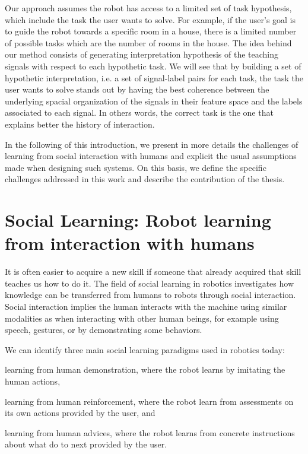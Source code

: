 Our approach assumes the robot has access to a limited set of task hypothesis, which include the task the user wants to solve. For example, if the user's goal is to guide the robot towards a specific room in a house, there is a limited number of possible tasks which are the number of rooms in the house. The idea behind our method consists of generating interpretation hypothesis of the teaching signals with respect to each hypothetic task. We will see that by building a set of hypothetic interpretation, i.e. a set of signal-label pairs for each task, the task the user wants to solve stands out by having the best coherence between the underlying spacial organization of the signals in their feature space and the labels associated to each signal. In others words, the correct task is the one that explains better the history of interaction.

In the following of this introduction, we present in more details the challenges of learning from social interaction with humans and explicit the usual assumptions made when designing such systems. On this basis, we define the specific challenges addressed in this work and describe the contribution of the thesis.

\section{Social Learning: Robot learning from interaction with humans}
\label{sec:intro:social}

It is often easier to acquire a new skill if someone that already acquired that skill teaches us how to do it. The field of social learning in robotics investigates how knowledge can be transferred from humans to robots through social interaction. Social interaction implies the human interacts with the machine using similar modalities as when interacting with other human beings, for example using speech, gestures, or by demonstrating some behaviors. 

We can identify three main social learning paradigms used in robotics today: \begin{inparaenum}[(a)] \item learning from human demonstration, where the robot learns by imitating the human actions, \item learning from human reinforcement, where the robot learn from assessments on its own actions provided by the user, and \item learning from human advices, where the robot learns from concrete instructions about what do to next provided by the user. \end{inparaenum}


